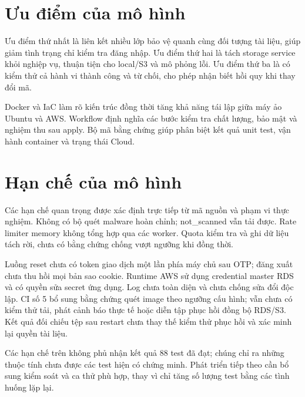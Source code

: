\section{Ưu điểm của mô hình}
Ưu điểm thứ nhất là liên kết nhiều lớp bảo vệ quanh cùng đối tượng tài liệu, giúp giảm tình trạng chỉ kiểm tra đăng nhập. Ưu điểm thứ hai là tách storage service khỏi nghiệp vụ, thuận tiện cho local/S3 và mô phỏng lỗi. Ưu điểm thứ ba là có kiểm thử cả hành vi thành công và từ chối, cho phép nhận biết hồi quy khi thay đổi mã.

Docker và IaC làm rõ kiến trúc đồng thời tăng khả năng tái lập giữa máy ảo Ubuntu và AWS. Workflow định nghĩa các bước kiểm tra chất lượng, bảo mật và nghiệm thu sau apply. Bộ mã bằng chứng giúp phân biệt kết quả unit test, vận hành container và trạng thái Cloud.

\section{Hạn chế của mô hình}
Các hạn chế quan trọng được xác định trực tiếp từ mã nguồn và phạm vi thực nghiệm. Không có bộ quét malware hoàn chỉnh; not\_scanned vẫn tải được. Rate limiter memory không tổng hợp qua các worker. Quota kiểm tra và ghi dữ liệu tách rời, chưa có bằng chứng chống vượt ngưỡng khi đồng thời.

Luồng reset chưa có token giao dịch một lần phía máy chủ sau OTP; đăng xuất chưa thu hồi mọi bản sao cookie. Runtime AWS sử dụng credential master RDS và có quyền sửa secret ứng dụng. Log chưa toàn diện và chưa chống sửa đổi độc lập. CI số 5 bổ sung bằng chứng quét image theo ngưỡng cấu hình; vẫn chưa có kiểm thử tải, phát cảnh báo thực tế hoặc diễn tập phục hồi đồng bộ RDS/S3. Kết quả đối chiếu tệp sau restart chưa thay thế kiểm thử phục hồi và xác minh lại quyền tài liệu.

Các hạn chế trên không phủ nhận kết quả 88 test đã đạt; chúng chỉ ra những thuộc tính chưa được các test hiện có chứng minh. Phát triển tiếp theo cần bổ sung kiểm soát và ca thử phù hợp, thay vì chỉ tăng số lượng test bằng các tình huống lặp lại.


